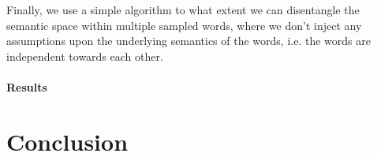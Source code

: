 \documentclass[a4paper,12pt,twoside,openright]{report}
\begin{document}
Finally, we use a simple algorithm to what extent we can disentangle the semantic space within multiple sampled words, where we don't inject any assumptions upon the underlying semantics of the words, i.e. the words are independent towards each other.


\subsubsection{Results}



\chapter{Conclusion}

\appendix
\singlespacing

 
 
\end{document}

